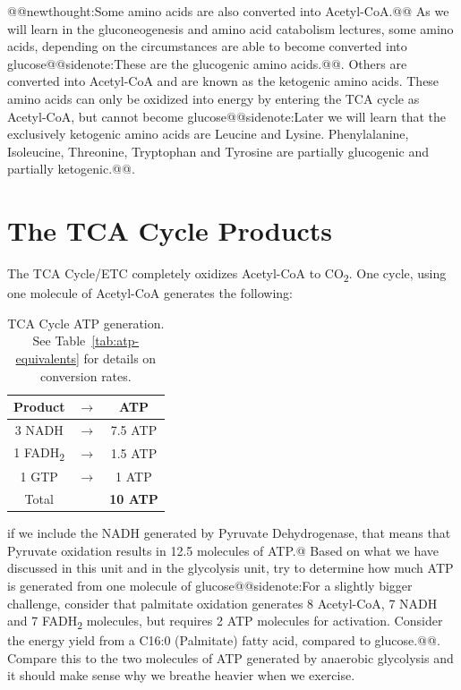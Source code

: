 \documentclass{tufte-handout}
\makeatletter
\def\newthought#1{@@newthought:#1@@}
\def\sidenote#1{@@sidenote:#1@@}
\makeatother
\begin{document}
\newthought{Some amino acids are also converted into Acetyl-CoA.}  As we will learn in the gluconeogenesis and amino acid catabolism lectures, some amino acids, depending on the circumstances are able to become converted into glucose\sidenote{These are the glucogenic amino acids.}.  Others are converted into Acetyl-CoA and are known as the ketogenic amino acids.  These amino acids can only be oxidized into energy by entering the TCA cycle as Acetyl-CoA, but cannot become glucose\sidenote{Later we will learn that the exclusively ketogenic amino acids are Leucine and Lysine.  Phenylalanine, Isoleucine, Threonine, Tryptophan and Tyrosine are partially glucogenic and partially ketogenic.}.

\section{The TCA Cycle Products}

The TCA Cycle/ETC completely oxidizes Acetyl-CoA to CO\textsubscript{2}.  One cycle, using one molecule of Acetyl-CoA generates the following:

\begin{table}
\centering
\caption{TCA Cycle ATP generation.  See Table~\ref{tab:atp-equivalents} for details on conversion rates.}\label{tab:atp-tca}
\begin{tabular}{ccc}
\hline
\textbf {Product} & $\rightarrow$ & \textbf{ATP}\\
\hline
3 NADH & $\rightarrow$ & 7.5 ATP \\
1 FADH\textsubscript{2} & $\rightarrow$ &  1.5 ATP  \\
1 GTP & $\rightarrow$ &  1 ATP  \\
\hline
Total & & \textbf{10 ATP}\\
\end{tabular}
\end{table}

if we include the NADH generated by Pyruvate Dehydrogenase, that means that Pyruvate oxidation results in 12.5 molecules of ATP.@  Based on what we have discussed in this unit and in the glycolysis unit, try to determine how much ATP is generated from one molecule of glucose\sidenote{For a slightly bigger challenge, consider that palmitate oxidation generates 8 Acetyl-CoA, 7 NADH and 7 FADH\textsubscript{2} molecules, but requires 2 ATP molecules for activation.  Consider the energy yield from a C16:0 (Palmitate) fatty acid, compared to glucose.}.  Compare this to the two molecules of ATP generated by anaerobic glycolysis and it should make sense why we breathe heavier when we exercise.
\end{document}
